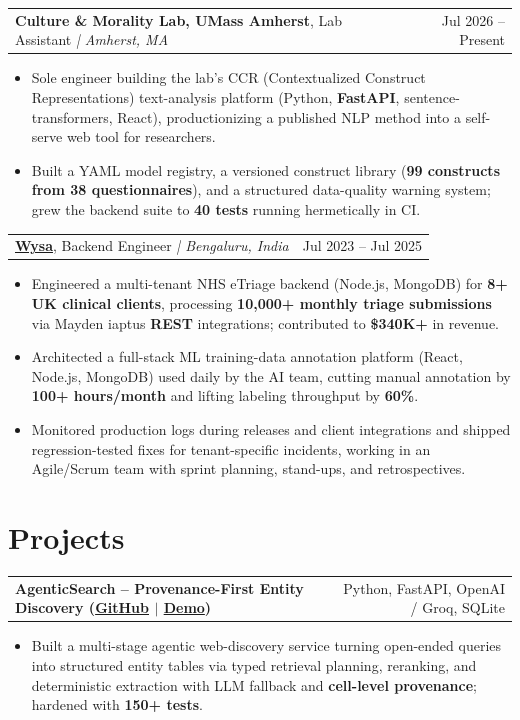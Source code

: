 \documentclass[letterpaper,11pt]{article}
\makeatletter
\newcommand{\expItem}[4]{%
  \vspace{2pt}
  \begin{tabular*}{\textwidth}{@{}l@{\extracolsep{\fill}}r@{}}
    \textbf{#1}, #2 \textit{| #3} & #4 \\
  \end{tabular*}\par\vspace{-3pt}
}
\newcommand{\projItem}[2]{%
  \vspace{2pt}
  \begin{tabular*}{\textwidth}{@{}l@{\extracolsep{\fill}}r@{}}
    \textbf{#1} & #2 \\
  \end{tabular*}\par\vspace{-3pt}
}
\makeatother
\begin{document}
\expItem{Culture \& Morality Lab, UMass Amherst}{Lab Assistant}{Amherst, MA}{Jul 2026 -- Present}
\begin{itemize}
  \item Sole engineer building the lab's CCR (Contextualized Construct Representations) text-analysis platform (Python, \textbf{FastAPI}, sentence-transformers, React), productionizing a published NLP method into a self-serve web tool for researchers.
  \item Built a YAML model registry, a versioned construct library (\textbf{99 constructs from 38 questionnaires}), and a structured data-quality warning system; grew the backend suite to \textbf{40 tests} running hermetically in CI.
\end{itemize}

\expItem{\href{https://www.wysa.io}{Wysa}}{Backend Engineer}{Bengaluru, India}{Jul 2023 -- Jul 2025}
\begin{itemize}
  \item Engineered a multi-tenant NHS eTriage backend (Node.js, MongoDB) for \textbf{8+ UK clinical clients}, processing \textbf{10{,}000+ monthly triage submissions} via Mayden iaptus \textbf{REST} integrations; contributed to \textbf{\$340K+} in revenue.
  \item Architected a full-stack ML training-data annotation platform (React, Node.js, MongoDB) used daily by the AI team, cutting manual annotation by \textbf{100+ hours/month} and lifting labeling throughput by \textbf{60\%}.
  \item Monitored production logs during releases and client integrations and shipped regression-tested fixes for tenant-specific incidents, working in an Agile/Scrum team with sprint planning, stand-ups, and retrospectives.
\end{itemize}

\section{Projects}

\projItem{AgenticSearch -- Provenance-First Entity Discovery {\normalfont\small(\href{https://github.com/Deva-1903/ciir_agentic_search}{GitHub} $\vert$ \href{https://agentic-search-negglszkwa-uc.a.run.app}{Demo})}}{Python, FastAPI, OpenAI / Groq, SQLite}
\begin{itemize}
  \item Built a multi-stage agentic web-discovery service turning open-ended queries into structured entity tables via typed retrieval planning, reranking, and deterministic extraction with LLM fallback and \textbf{cell-level provenance}; hardened with \textbf{150+ tests}.
\end{itemize}
\end{document}
